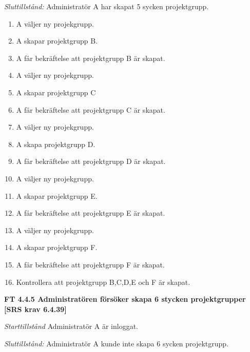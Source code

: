 \documentclass[a4paper]{article}
\begin{document}
\emph{Sluttillstånd:} Administratör A har skapat 5 sycken projektgrupp.

\begin{enumerate}
\item A väljer ny projekgrupp.
\item A skapar projektgrupp B.
\item A får bekräftelse att projektgrupp B är skapat.
\item A väljer ny projekgrupp.
\item A skapar projektgrupp C
\item A får bekräftelse att projektgrupp C är skapat.
\item A väljer ny projekgrupp.
\item A skapa projektgrupp D.
\item A får bekräftelse att projektgrupp D är skapat.
\item A väljer ny projekgrupp.
\item A skapar projektgrupp E.
\item A får bekräftelse att projektgrupp E är skapat.
\item A väljer ny projekgrupp.
\item A skapar projektgrupp F.
\item A får bekräftelse att projektgrupp F är skapat.
\item Kontrollera att projektgrupp B,C,D,E och F är skapat.
\end{enumerate}

\textbf{FT 4.4.5 Administratören försöker skapa 6 stycken projektgrupper [SRS krav 6.4.39]}

\emph{Starttillstånd} Administratör A är inloggat.

\emph{Sluttillstånd:} Administratör A kunde inte skapa 6 sycken  projektgrupp.
\end{document}

